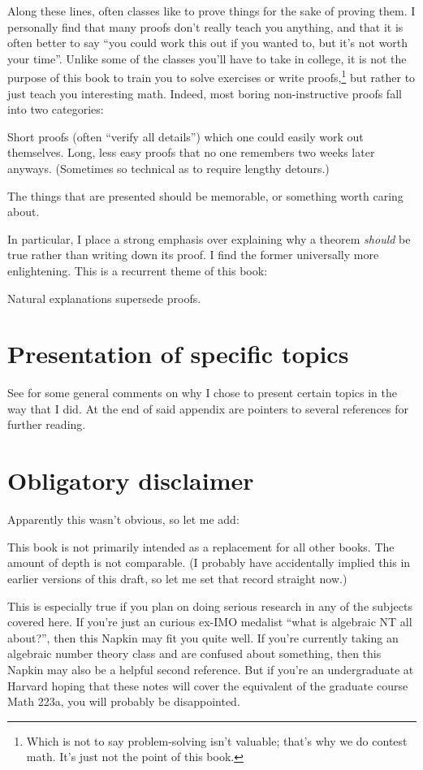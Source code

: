 Along these lines, often classes like to prove things for the sake of proving them.
I personally find that many proofs don't really teach you anything,
and that it is often better to say ``you could work this out if you wanted to, but it's not worth your time''.
Unlike some of the classes you'll have to take in college,
it is not the purpose of this book to train you to solve exercises or write proofs,\footnote{%
	Which is not to say problem-solving isn't valuable;
	that's why we do contest math.
	It's just not the point of this book.}
but rather to just teach you interesting math.
Indeed, most boring non-instructive proofs fall into two categories:
\begin{enumerate}[(i)]
	\ii Short proofs (often ``verify all details'')
	which one could easily work out themselves.
	\ii Long, less easy proofs that no one remembers
	two weeks later anyways.
	(Sometimes so technical as to require lengthy detours.)
\end{enumerate}
The things that are presented should be memorable, or something worth caring about.

In particular, I place a strong emphasis over explaining why a theorem \emph{should}
be true rather than writing down its proof.
I find the former universally more enlightening.
This is a recurrent theme of this book:
\begin{moral}
	Natural explanations supersede proofs.
\end{moral}

\section*{Presentation of specific topics}
See  for some general comments on why I chose
to present certain topics in the way that I did.
At the end of said appendix are pointers to
several references for further reading.

\section*{Obligatory disclaimer}
Apparently this wasn't obvious, so let me add:

This book is not primarily intended as a replacement for all other books.
The amount of depth is not comparable.
(I probably have accidentally implied this in earlier versions of this draft,
so let me set that record straight now.)

This is especially true if you plan on doing serious research
in any of the subjects covered here.
If you're just an curious ex-IMO medalist ``what is algebraic NT all about?'',
then this Napkin may fit you quite well.
If you're currently taking an algebraic number theory class and are confused
about something, then this Napkin may also be a helpful second reference.
But if you're an undergraduate at Harvard hoping that these notes
will cover the equivalent of the graduate course Math 223a,
you will probably be disappointed.


